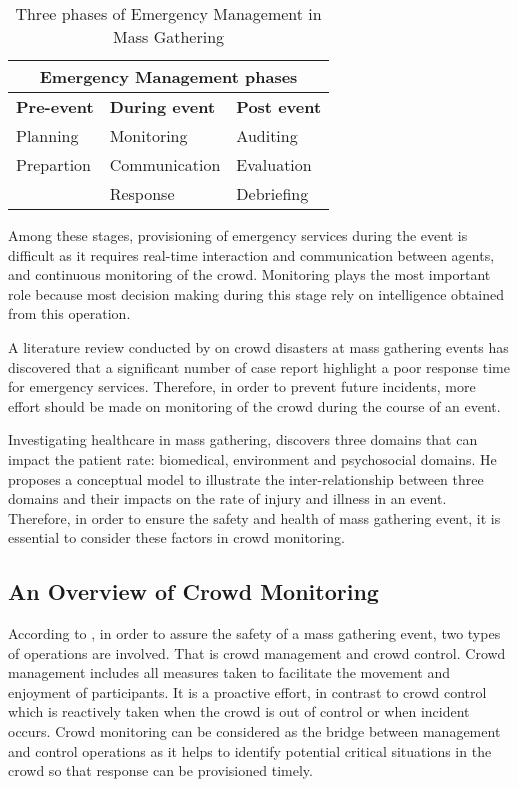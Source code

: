 \begin{table}
	\caption{Three phases of Emergency Management in Mass Gathering}
	\label{table:phaseOfEm}
	\centering
	\begin{tabular}{|p{4cm}|p{4cm}|p{4cm}|}
		\hline
		\multicolumn{3}{|c|}{\textbf{Emergency Management phases}} \\ \hline \hline
		\textbf{Pre-event} & \textbf{During event} & \textbf{Post event} \\	\hline
		Planning & Monitoring  & Auditing  \\
		Prepartion & Communication & Evaluation \\
		& Response & Debriefing \\
		\hline
	\end{tabular}
\end{table}

Among these stages, provisioning of emergency services during the event is difficult as it requires real-time interaction and communication between agents, and continuous monitoring of the crowd.  Monitoring plays the most important role because most decision making during this stage rely on intelligence obtained from this operation. 

A literature review conducted by \citet{Soomaroo2012} on crowd disasters at mass gathering events has discovered that a significant number of case report highlight a poor response time for emergency services. Therefore, in order to prevent future incidents, more effort should be made on monitoring of the crowd during the course of an event. 

Investigating healthcare in mass gathering, \citet{Arbon2004} discovers three domains that can impact the patient rate: biomedical, environment and psychosocial domains. He proposes a conceptual model to illustrate the inter-relationship between three domains and their impacts on the rate of injury and illness in an event. Therefore, in order to ensure the safety and health of mass gathering event, it is essential to consider these factors in crowd monitoring.

\subsection{An Overview of Crowd Monitoring}

According to \citet{Berlonghi1995}, in order to assure the safety of a mass gathering event, two types of operations are involved. That is crowd management and crowd control. Crowd management includes all measures taken to facilitate the movement and enjoyment of participants. It is a proactive effort, in contrast to crowd control which is reactively taken when the crowd is out of control or when incident occurs. Crowd monitoring can be considered as the bridge between management and control operations as it helps to identify potential critical situations in the crowd so that response can be provisioned timely.

